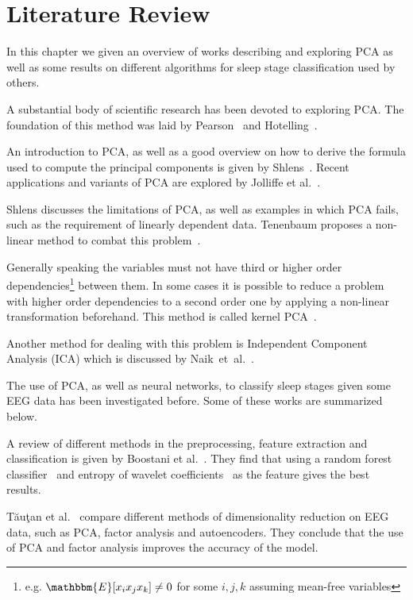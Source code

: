 \chapter{\color{change} Literature Review \color{black}}
\label{chapter:study_of_literature}

\color{change} In this chapter we given an overview of works describing and exploring PCA as well as some results on different algorithms for sleep stage classification used by others. \color{black}

A substantial body of scientific research has been devoted to exploring PCA.
The foundation of this method was laid by Pearson~\cite{Pearson1901} and Hotelling~\cite{Hotelling1933}.

An introduction to PCA, as well as a good overview on how to derive the formula used to compute the principal components is given by Shlens~\cite{Shlens2014}.
Recent applications and variants of PCA are explored by Jolliffe et al.~\cite{Jolliffe2016}.

Shlens discusses the limitations of PCA, as well as examples in which PCA fails, such as the requirement of linearly dependent data.
Tenenbaum proposes a non-linear method to combat this problem~\cite{Tenenbaum2000}.

Generally speaking the variables must not have third or higher order dependencies\footnote{e.g. $\mathbbm{E}[x_ix_jx_k] \neq 0$ for some $i, j, k$ assuming mean-free variables} between them. In some cases it is possible to reduce a problem with higher order dependencies to a second order one by applying a non-linear transformation beforehand. This method is called kernel PCA~\cite{Scholkopf1997}.

Another method for dealing with this problem is Independent Component Analysis (ICA) which is discussed by Naik~et~al.~\cite{Naik2011}.

The use of PCA, as well as neural networks, to classify sleep stages given some EEG data has been investigated before. Some of these works are summarized below.

A review of different methods in the preprocessing, feature extraction and classification is given by Boostani et al.~\cite{Boostani2017}. They find that using a random forest classifier~\cite{Breiman2001} and entropy of wavelet coefficients~\cite{Chui1994} as the feature gives the best results.

Tăuţan et al.~\cite{Tautan2021} compare different methods of dimensionality reduction on EEG data, such as PCA, factor analysis and autoencoders. They conclude that the use of PCA and factor analysis improves the accuracy of the model.

